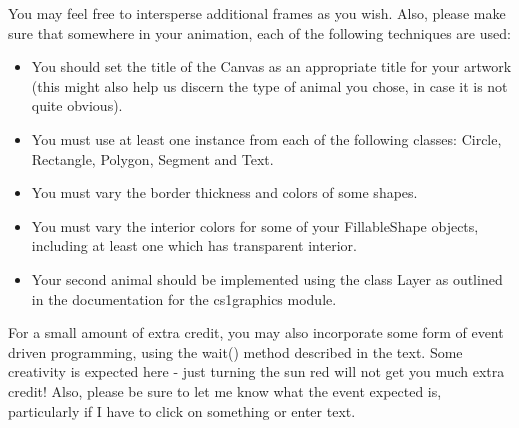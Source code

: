 \documentclass[11pt]{article}
\begin{document}
You may feel free to intersperse additional frames as you wish.
Also, please make sure that somewhere in your animation, each of the
following techniques are used:

\begin{itemize}

\item You should set the title of the Canvas as an appropriate title
for your artwork (this might also help us discern the type of animal
you chose, in case it is not quite obvious).

\item You must use at least one instance from each of the following
classes: Circle, Rectangle, Polygon, Segment and Text.

\item You must vary the border thickness and colors of some shapes.

\item You must vary the interior colors for some of your FillableShape
objects, including at least one which has transparent interior.

\item Your second animal should be implemented using the class Layer
as outlined in the documentation for the cs1graphics module.

\end{itemize}

For a small amount of extra credit, you may also incorporate some
form of event driven programming, using the wait() method described
in the text. Some creativity is expected here - just turning the sun
red will not get you much extra credit! Also, please be sure to let
me know what the event expected is, particularly if I have to click
on something or enter text.
\end{document}
